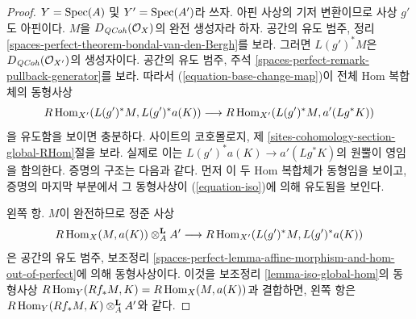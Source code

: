 \begin{proof}
$Y = \mathop{\mathrm{Spec}}(A)$ 및 $Y' = \mathop{\mathrm{Spec}}(A')$라 쓰자. 아핀 사상의 기저 변환이므로
사상 $g'$도 아핀이다. $M$을 $D_{\mathit{QCoh}}(\mathcal{O}_X)$의 완전 생성자라
하자. 공간의 유도 범주, 정리
\ref{spaces-perfect-theorem-bondal-van-den-Bergh}를 보라. 그러면
$L(g')^*M$은 $D_{\mathit{QCoh}}(\mathcal{O}_{X'})$의 생성자이다. 공간의 유도 범주,
주석 \ref{spaces-perfect-remark-pullback-generator}를 보라.
따라서 (\ref{equation-base-change-map})이 전체 Hom 복합체의 동형사상
\begin{equation}
\label{equation-iso}
R\mathop{\mathrm{Hom}}\nolimits_{X'}(L(g')^*M, L(g')^*a(K))
\longrightarrow
R\mathop{\mathrm{Hom}}\nolimits_{X'}(L(g')^*M, a'(Lg^*K))
\end{equation}
을 유도함을 보이면 충분하다. 사이트의 코호몰로지, 제
\ref{sites-cohomology-section-global-RHom}절을 보라. 실제로 이는
$L(g')^*a(K) \to a'(Lg^*K)$의 원뿔이 영임을 함의한다.
증명의 구조는 다음과 같다. 먼저 이 두 Hom 복합체가 동형임을 보이고,
증명의 마지막 부분에서 그 동형사상이 (\ref{equation-iso})에 의해
유도됨을 보인다.

\medskip\noindent
왼쪽 항. $M$이 완전하므로 정준 사상
$$
R\mathop{\mathrm{Hom}}\nolimits_X(M, a(K)) \otimes^\mathbf{L}_A A'
\longrightarrow
R\mathop{\mathrm{Hom}}\nolimits_{X'}(L(g')^*M, L(g')^*a(K))
$$
은 공간의 유도 범주, 보조정리
\ref{spaces-perfect-lemma-affine-morphism-and-hom-out-of-perfect}에 의해
동형사상이다. 이것을 보조정리 \ref{lemma-iso-global-hom}의 동형사상
$R\mathop{\mathrm{Hom}}\nolimits_Y(Rf_*M, K) = R\mathop{\mathrm{Hom}}\nolimits_X(M, a(K))$과 결합하면, 왼쪽 항은
$R\mathop{\mathrm{Hom}}\nolimits_Y(Rf_*M, K) \otimes^\mathbf{L}_A A'$와 같다.


\end{proof}
